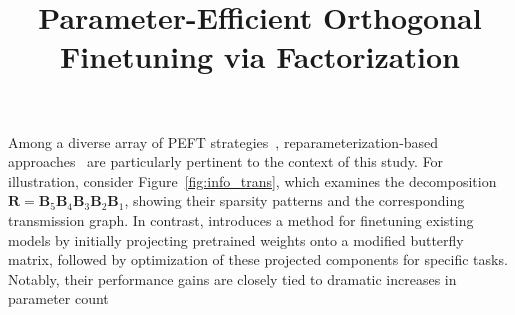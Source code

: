 \title{Parameter-Efficient Orthogonal Finetuning via Factorization}
Among a diverse array of PEFT strategies~\cite{houlsby2019parameter,aghajanyan2020intrinsic,hulora2022,edalati2022krona,wang2022adamix,gheini2021cross,zaken2022bitfit,guo2020parameter,sung2021training,ansell2022composable,lester2021power,li2021prefix,vu2022spot,he2021towards,mao2021unipelt,karimi2021compacter,liu2022few,sung2022lst,chen2022parameter,jia2022visual,chen2022adaptformer,zhang2022neural,jie2023fact,lian2022scaling,luo2023towards}, reparameterization-based approaches~\cite{aghajanyan2020intrinsic,hulora2022,edalati2022krona} are particularly pertinent to the context of this study. For illustration, consider Figure~\ref{fig:info_trans}, which examines the decomposition $\bm{R}=\bm{B}_5\bm{B}_4\bm{B}_3\bm{B}_2\bm{B}_1$, showing their sparsity patterns and the corresponding transmission graph. In contrast, \cite{dao2022monarch} introduces a method for finetuning existing models by initially projecting pretrained weights onto a modified butterfly matrix, followed by optimization of these projected components for specific tasks. Notably, their performance gains are closely tied to dramatic increases in parameter count

